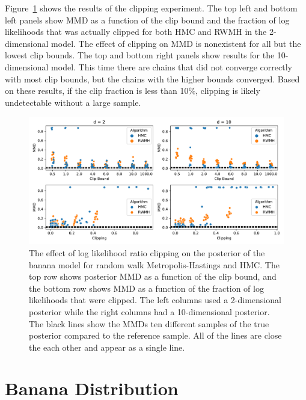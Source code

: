 \documentclass[english,twoside,openright]{HYgraduMLDS}
\begin{document}
Figure~\ref{clip_effect_fig} shows the results of the clipping experiment.
The top left and bottom left panels show MMD as a function of the clip bound 
and the fraction of log likelihoods that was actually clipped for both 
HMC and RWMH in the 2-dimensional model. The effect of clipping on MMD 
is nonexistent for all but the lowest clip bounds. The top and bottom right 
panels show results for the 10-dimensional model. This time there are chains 
that did not converge correctly with most clip bounds, but the chains with 
the higher bounds converged. Based on these results, if the clip fraction is 
less than 10\%, clipping is likely undetectable without a large sample.

\begin{figure}[h]
    \centering
    \includegraphics[width=\textwidth]{figures/clipping.pdf}
    \caption{
        The effect of log likelihood ratio clipping on the posterior of the 
        banana model for random walk Metropolis-Hastings and HMC.
        The top row shows posterior MMD as a function of the clip bound, and 
        the bottom row shows MMD as a function of the fraction of log likelihoods 
        that were clipped. The left columns used a 2-dimensional posterior 
        while the right columns had a 10-dimensional posterior. 
        The black lines show the MMDs ten different samples of the true posterior
        compared to the reference sample. All of the lines are close the each 
        other and appear as a single line.
    }
    \label{clip_effect_fig}
\end{figure}

\section{Banana Distribution}\label{dp_mcmc_comparison}
\end{document}

